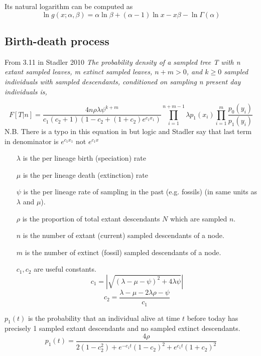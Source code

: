 \documentclass{llncs}
\begin{document}
Its natural logarithm can be computed as
$$ \ln g(x;\alpha,\beta) = \alpha\ln\beta + (\alpha-1)\ln x -x\beta - \ln\Gamma(\alpha) $$

\subsection{Birth-death process}
From 3.11 in Stadler 2010 \textit{The probability density of a sampled tree T with n
extant sampled leaves, m extinct sampled leaves, $n+m > 0$, and $k \geq 0$
sampled individuals with sampled descendants, conditioned on
sampling n present day individuals is,}

$$F[T|n] = \frac{4n\rho\lambda\psi^{k+m}}{c_1(c_2+1)(1-c_2+(1+c_2)e^{c_1x_1})}\prod_{i=1}^{n+m-1}\lambda p_1(x_i)\prod_{i=1}^{m}\frac{p_0(y_i)}{p_1(y_i)}$$
N.B. There is a typo in this equation in \cite{Stadler2010} but logic and Stadler say that last term in denominator is $e^{c_1x_1}$ not  $e^{c_1x}$ \\

\begin{enumerate}
\item[$\lambda$]  is the per lineage birth (speciation) rate
\item[$\mu$]  is the per lineage death (extinction) rate
\item[$\psi$]  is the per lineage rate of sampling in the past (e.g. fossils) (in same units as $\lambda$ and $\mu$).
\item[$\rho$ ] is the proportion of total extant descendants $N$ which are sampled $n$.
\item[$n$] is the number of extant (current) sampled descendants of a node.
\item[$m$] is the number of extinct (fossil) sampled descendants of a node.
\item[$c_1,c_2$]  are useful constants.
$$c_1 = |\sqrt{(\lambda-\mu-\psi)^2 + 4\lambda\psi}|$$
$$c_2 = \frac{\lambda-\mu-2\lambda\rho-\psi}{c_1}$$
\end{enumerate}

$p_1(t)$ is the probability that an individual alive at time $t$ before today has precisely 1 sampled extant descendants and no sampled extinct descendants.
$${p_1}(t) = \frac{4\rho}{2(1-c_2^2)+e^{-c_1t}(1-c_2)^2+e^{c_1t}(1+c_2)^2}$$
\end{document}
